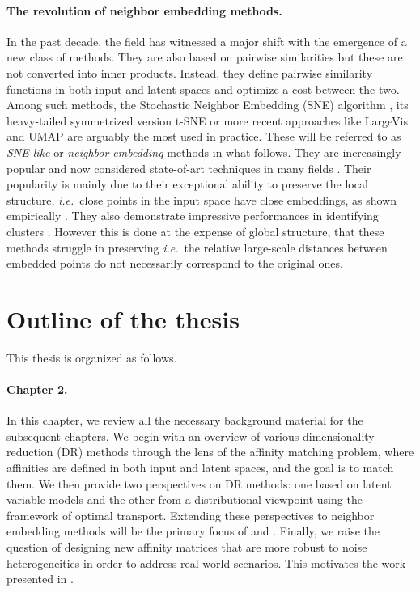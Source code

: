 \paragraph{The revolution of neighbor embedding methods.}
In the past decade, the field has witnessed a major shift with the emergence of a new class of methods. They are also based on pairwise similarities but these are not converted into inner products. Instead, they define pairwise similarity functions in both input and latent spaces and optimize a cost between the two. Among such methods, the Stochastic Neighbor Embedding (SNE) algorithm \citep{NIPS2002SNE}, its heavy-tailed symmetrized version t-SNE \citep{maaten2008tSNE} or more recent approaches like LargeVis \citep{tang2016visualizing} and UMAP \citep{mcinnes2018umap} are arguably the most used in practice. These will be referred to as \textit{SNE-like} or \textit{neighbor embedding} methods in what follows. They are increasingly popular and now considered state-of-art techniques in many fields \citep{li2017application,kobak2019art,anders2018dissecting}. Their popularity is mainly due to their exceptional ability to preserve the local structure, \textit{i.e.}\ close points in the input space have close embeddings, as shown empirically \citep{wang2021understanding}. They also demonstrate impressive performances in identifying clusters \citep{arora2018analysis, linderman2019clustering}. However this is done at the expense of global structure, that these methods struggle in preserving \citep{wattenberg2016use, coenen2019understanding} \textit{i.e.}\ the relative large-scale distances between embedded points do not necessarily correspond to the original ones.


\section{Outline of the thesis}

This thesis is organized as follows.

\paragraph{Chapter 2.}
In this chapter, we review all the necessary background material for the subsequent chapters. We begin with an overview of various dimensionality reduction (DR) methods through the lens of the affinity matching problem, where affinities are defined in both input and latent spaces, and the goal is to match them. We then provide two perspectives on DR methods: one based on latent variable models and the other from a distributional viewpoint using the framework of optimal transport. Extending these perspectives to neighbor embedding methods will be the primary focus of  and . Finally, we raise the question of designing new affinity matrices that are more robust to noise heterogeneities in order to address real-world scenarios. This motivates the work presented in .

